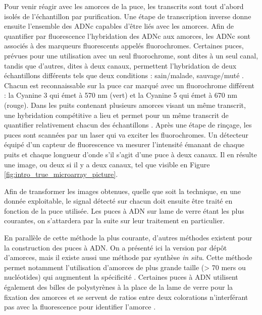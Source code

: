 Pour venir réagir avec les amorces de la puce, les transcrits sont tout d'abord isolés de l'échantillon par purification. Une étape de transcription inverse donne ensuite l'ensemble des ADNc capables d'être liés avec les amorces. Afin de quantifier par fluorescence l'hybridation des ADNc aux amorces, les ADNc sont associés à des marqueurs fluorescents appelés fluorochromes. Certaines puces, prévues pour une utilisation avec un seul fluorochrome, sont dites à un seul canal, tandis que d'autres, dites à deux canaux, permettent l'hybridation de deux échantillons différents tels que deux conditions : sain/malade, sauvage/muté \cite{Bumgarner2013Jan}. Chacun est reconnaissable sur la puce car marqué avec un fluorochrome différent : la Cyanine 3 qui émet à  570 nm (vert) et la Cyanine 5 qui émet à 670 nm (rouge). Dans les puits contenant plusieurs amorces visant un même transcrit, une hybridation compétitive a lieu et permet pour un même transcrit de quantifier relativement chacun des échantillons \cite{Koltai2008Apr}. Après une étape de rinçage, les puces sont scannées par un laser qui va exciter les fluorochromes. Un détecteur équipé d'un capteur de fluorescence va mesurer l'intensité émanant de chaque puits et chaque longueur d'onde s'il s'agit d'une puce à deux canaux. Il en résulte une image, ou deux si il y a deux canaux, tel que visible en Figure \ref{fig:intro_true_microarray_picture}.



Afin de transformer les images obtenues, quelle que soit la technique, en une donnée exploitable, le signal détecté sur chacun doit ensuite être traité en fonction de la puce utilisée. Les puces à ADN sur lame de verre étant les plus courantes, on s'attardera par la suite sur leur traitement en particulier.

En parallèle de cette méthode la plus courante, d'autres méthodes existent pour la construction des puces à ADN. On a présenté ici la version par dépôt d'amorces, mais il existe aussi une méthode par synthèse \textit{in situ}. Cette méthode permet notamment l'utilisation d'amorces de plus grande taille (> 70 mers ou nucléotides) qui augmentent la spécificité \cite{Liu2010}. Certaines puces à ADN utilisent également des billes de polystyrènes à la place de la lame de verre pour la fixation des amorces et se servent de ratios entre deux colorations n'interférant pas avec la fluorescence pour identifier l'amorce \cite{Nesterov-Mueller2014Oct}. 


